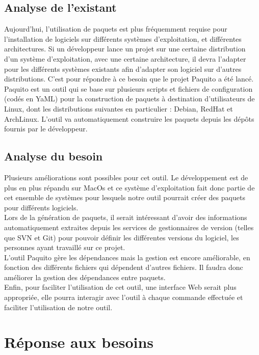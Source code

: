 \documentclass[12pt,a4paper]{article}
\begin{document}
	\subsection{Analyse de l'existant}
	Aujourd'hui, l'utilisation de paquets est plus fréquemment requise pour l'installation de logiciels sur différents systèmes d'exploitation, et différentes architectures. Si un développeur lance un projet sur une certaine distribution d'un système d'exploitation, avec une certaine architecture, il devra l'adapter pour les différents systèmes existants afin d'adapter son logiciel sur d'autres distributions. C'est pour répondre à ce besoin que le projet Paquito a été lancé.\\
Paquito est un outil qui se base sur plusieurs scripts et fichiers de configuration (codés en YaML) pour la construction de paquets à destination d'utilisateurs de Linux, dont les distributions suivantes en particulier : Debian, RedHat et ArchLinux. L'outil va automatiquement construire les paquets depuis les dépôts fournis par le développeur.
	\subsection{Analyse du besoin}
	Plusieurs améliorations sont possibles pour cet outil. Le développement est de plus en plus répandu sur MacOs et ce système d'exploitation fait donc partie de cet ensemble de systèmes pour lesquels notre outil pourrait créer des paquets pour différents logiciels. \\
Lors de la génération de paquets, il serait intéressant d'avoir des informations automatiquement extraites depuis les services de gestionnaires de version (telles que SVN et Git) pour pouvoir définir les différentes versions du logiciel, les personnes ayant travaillé sur ce projet.\\
L'outil Paquito gère les dépendances mais la gestion est encore améliorable, en fonction des différents fichiers qui dépendent d'autres fichiers. Il faudra donc améliorer la gestion des dépendances entre paquets.\\
Enfin, pour faciliter l'utilisation de cet outil, une interface Web serait plus appropriée, elle pourra interagir avec l'outil à chaque commande effectuée et faciliter l'utilisation de notre outil.

\section{Réponse aux besoins}
\end{document}
